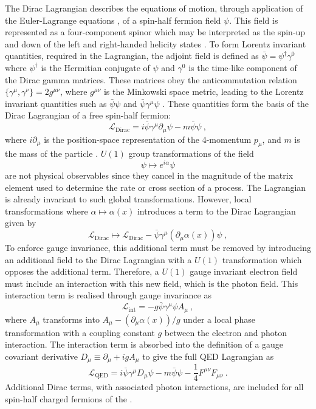 The Dirac Lagrangian describes the equations of motion, through application of
the Euler-Lagrange equations \cite{Troutman1983}, of a spin-half fermion field
$\psi$. This field is represented as a four-component spinor which may be
interpreted as the spin-up and down of the left and right-handed helicity
states \cite{Peskin:1995ev}. To form Lorentz invariant quantities, required in
the Lagrangian, the adjoint field is defined as
$\bar{\psi}=\psi^{\dagger}\gamma^0$ where $\psi^{\dagger}$ is the Hermitian
conjugate of $\psi$ and $\gamma^0$ is the time-like component of the Dirac
gamma matrices. These matrices obey the anticommutation relation
$\{\gamma^{\mu},\gamma^{\nu}\} = 2g^{\mu\nu}$, where $g^{\mu\nu}$ is the
Minkowski space metric, leading to the Lorentz invariant quantities such as
$\bar{\psi}\psi$ and $\bar{\psi}\gamma^{\mu}\psi$ \cite{Peskin:1995ev}. These
quantities form the basis of the Dirac Lagrangian of a free spin-half fermion:
%
\begin{equation}
    \mathcal{L}_{\mathrm{Dirac}} = i\bar{\psi}\gamma^{\mu}\partial_{\mu}\psi - m\bar{\psi}\psi\ ,
\end{equation}
%
where $i\partial_{\mu}$ is the position-space representation of the 4-momentum
$p_\mu$, and $m$ is the mass of the particle \cite{1928RSPSA.117..610D}.
$U(1)$ group transformations of the field
%
\begin{equation}
    \psi \mapsto e^{i\alpha}\psi
\end{equation}
%
are not physical observables since they cancel in the magnitude of the matrix
element used to determine the rate or cross section of a process. The
Lagrangian is already invariant to such global transformations. However, local
transformations where $\alpha\mapsto\alpha(x)$ introduces a term to the Dirac Lagrangian given by
%
\begin{equation}
    \mathcal{L}_{\mathrm{Dirac}} \mapsto \mathcal{L}_{\mathrm{Dirac}}  - \bar{\psi}\gamma^{\mu}(\partial_\mu\alpha(x))\psi\ ,
\end{equation}
%
To enforce gauge invariance, this additional term must be removed by
introducing an additional field to the Dirac Lagrangian with a $U(1)$
transformation which opposes the additional term. Therefore, a $U(1)$ gauge
invariant electron field must include an interaction with this new field,
which is the photon field. This interaction term is
realised through gauge invariance as
%
\begin{equation}
    \mathcal{L}_{\mathrm{int}} = -g\bar{\psi}\gamma^{\mu}\psi A_{\mu}\ ,
\end{equation}
%
where $A_\mu$ transforms into $A_\mu - (\partial_\mu\alpha(x))/g$ under a
local phase transformation with a coupling constant $g$ between the
electron and photon interaction. The interaction term is absorbed into the
definition of a gauge covariant derivative $D_{\mu} \equiv \partial_\mu
+igA_\mu$ to give the full QED Lagrangian as
%
\begin{equation}
    \mathcal{L}_{\mathrm{QED}} = i\bar{\psi}\gamma^{\mu}D_{\mu}\psi - m \bar{\psi}\psi - \frac{1}{4}F^{\mu\nu}F_{\mu\nu}\ .
\end{equation}
%
Additional Dirac terms, with associated photon interactions, are included for
all spin-half charged fermions of the \SM.


